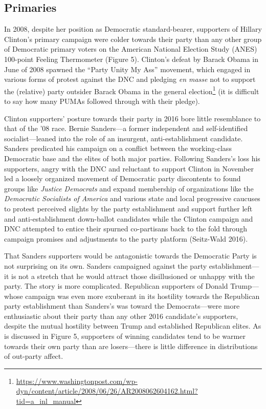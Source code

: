 \documentclass[
]{article}
\begin{document}
\hypertarget{primaries}{%
\subsection{Primaries}\label{primaries}}

In 2008, despite her position as Democratic standard-bearer, supporters of Hillary Clinton's primary campaign were colder towards their party than any other group of Democratic primary voters on the American National Election Study (ANES) 100-point Feeling Thermometer (Figure 5). Clinton's defeat by Barack Obama in June of 2008 spawned the ``Party Unity My Ass'' movement, which engaged in various forms of protest against the DNC and pledging \emph{en masse} not to support the (relative) party outsider Barack Obama in the general election\footnote{\url{https://www.washingtonpost.com/wp-dyn/content/article/2008/06/26/AR2008062604162.html?tid=a_inl_manual}} (it is difficult to say how many PUMAs followed through with their pledge).

Clinton supporters' posture towards their party in 2016 bore little resemblance to that of the '08 race. Bernie Sanders---a former independent and self-identified socialist---leaned into the role of an insurgent, anti-establishment candidate. Sanders predicated his campaign on a conflict between the working-class Democratic base and the elites of both major parties. Following Sanders's loss his supporters, angry with the DNC and reluctant to support Clinton in November led a loosely organized movement of Democratic party discontents to found groups like \emph{Justice Democrats} and expand membership of organizations like the \emph{Democratic Socialists of America} and various state and local progressive caucuses to protest perceived slights by the party establishment and support further left and anti-establishment down-ballot candidates while the Clinton campaign and DNC attempted to entice their spurned co-partisans back to the fold through campaign promises and adjustments to the party platform (Seitz-Wald 2016).

That Sanders supporters would be antagonistic towards the Democratic Party is not surprising on its own. Sanders campaigned against the party establishment---it is not a stretch that he would attract those disillusioned or unhappy with the party. The story is more complicated. Republican supporters of Donald Trump---whose campaign was even more exuberant in its hostility towards the Republican party establishment than Sanders's was toward the Democrats---were more enthusiastic about their party than any other 2016 candidate's supporters, despite the mutual hostility between Trump and established Republican elites. As is discussed in Figure 5, supporters of winning candidates tend to be warmer towards their own party than are losers---there is little difference in distributions of out-party affect.
\end{document}
